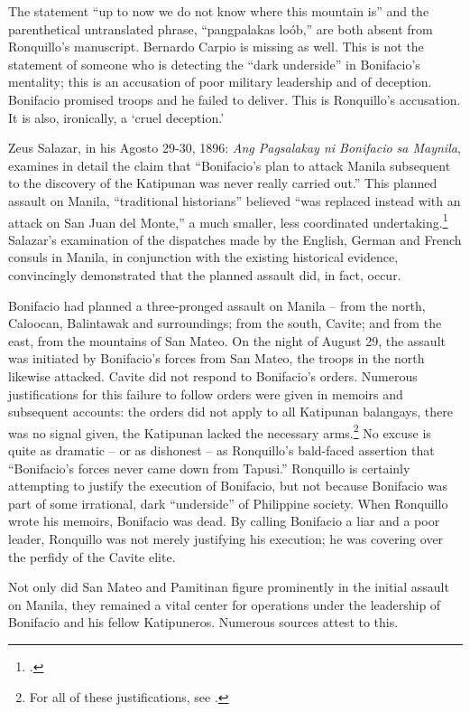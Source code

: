 The statement \enquote{up to now we do not know where this mountain is} and the parenthetical untranslated phrase, \enquote{pangpalakas lo\'ob,} are both absent from Ronquillo's manuscript. Bernardo Carpio is missing as well. This is not the statement of someone who is detecting the \enquote{dark underside} in Bonifacio's mentality; this is an accusation of poor military leadership and of deception. Bonifacio promised troops and he failed to deliver. This is Ronquillo's accusation. It is also, ironically, a \enquote*{cruel deception.}

Zeus Salazar, in his Agosto 29-30, 1896: \textit{Ang Pagsalakay ni Bonifacio sa Maynila}, examines in detail the claim that \enquote{Bonifacio's plan to attack Manila subsequent to the discovery of the Katipunan was never really carried out.} This planned assault on Manila, \enquote{traditional historians} believed \enquote{was replaced instead with an attack on San Juan del Monte,} a much smaller, less coordinated undertaking.\footcite[96]{Salazar1994} Salazar's examination of the dispatches made by the English, German and French consuls in Manila, in conjunction with the existing historical evidence, convincingly demonstrated that the planned assault did, in fact, occur.

Bonifacio had planned a three-pronged assault on Manila -- from the north, Caloocan, Balintawak and surroundings; from the south, Cavite; and from the east, from the mountains of San Mateo. On the night of August 29, the assault was initiated by Bonifacio's forces from San Mateo, the troops in the north likewise attacked. Cavite did not respond to Bonifacio's orders. Numerous justifications for this failure to follow orders were given in memoirs and subsequent accounts: the orders did not apply to all Katipunan balangays, there was no signal given, the Katipunan lacked the necessary arms.\footnote{For all of these justifications, see \cite[108-11]{Salazar1994}.} No excuse is quite as dramatic -- or as dishonest -- as Ronquillo's bald-faced assertion that \enquote{Bonifacio’s forces never came down from Tapusi.} Ronquillo is certainly attempting to justify the execution of Bonifacio, but not because Bonifacio was part of some irrational, dark \enquote{underside} of Philippine society. When Ronquillo wrote his memoirs, Bonifacio was dead. By calling Bonifacio a liar and a poor leader, Ronquillo was not merely justifying his execution; he was covering over the perfidy of the Cavite elite.

Not only did San Mateo and Pamitinan figure prominently in the initial assault on Manila, they remained a vital center for operations under the leadership of Bonifacio and his fellow Katipuneros. Numerous sources attest to this. 


